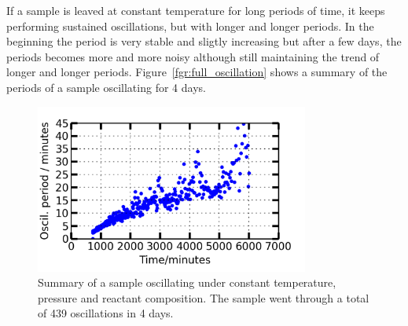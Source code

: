 \documentclass[8.5pt,twoside,twocolumn]{article}
\begin{document}
If a sample is leaved at constant temperature for long periods of time, it keeps performing sustained oscillations, but with longer and longer periods. In the beginning the period is very stable and sligtly increasing but after a few days, the periods becomes more and more noisy although still maintaining the trend of longer and longer periods. Figure~\ref{fgr:full_oscillation} shows a summary of the periods of a sample oscillating for 4 days. 
\begin{figure}[h]
\centering
  \includegraphics[width=9cm]{summary_of_long_measurement.png}
  \caption{Summary of a sample oscillating under constant temperature, pressure and reactant composition. The sample went through a total of 439 oscillations in 4 days.}
  \label{fgr:long_measurement}
\end{figure}
\end{document}
